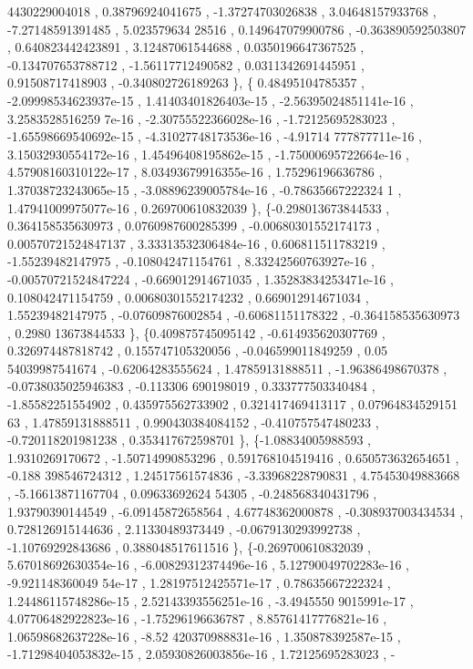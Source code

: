 \begin{DoxyCode}
      4430229004018 ,  0.38796924041675 , -1.37274703026838 ,  3.04648157933768 , -7.27148591391485 ,  5.023579634
      28516 , 0.149647079900786 , -0.363890592503807 , 0.640823442423891 ,  3.12487061544688 , 0.0350196647367525 
      , -0.134707653788712 , -1.56117712490582 , 0.0311342691445951 ,  0.91508717418903 , -0.340802726189263 \},
\{ 0.48495104785357 , -2.09998534623937e-15 , 1.41403401826403e-15 , -2.56395024851141e-16 , 3.2583528516259
      7e-16 , -2.30755522366028e-16 , -1.72125695283023 , -1.65598669540692e-15 , -4.31027748173536e-16 , -4.91714
      777877711e-16 , 3.15032930554172e-16 , 1.45496408195862e-15 , -1.75000695722664e-16 , 4.57908160310122e-17 ,
       8.03493679916355e-16 ,  1.75296196636786 , 1.37038723243065e-15 , -3.08896239005784e-16 , -0.78635667222324
      1 , 1.47941009975077e-16 , 0.269700610832039 \},
\{-0.298013673844533 , 0.364158535630973 , 0.0760987600285399 , -0.00680301552174173 , 0.00570721524847137 ,
       3.33313532306484e-16 , 0.606811511783219 , -1.55239482147975 , -0.108042471154761 , 8.33242560763927e-16 , 
      -0.00570721524847224 , -0.669012914671035 , 1.35283834253471e-16 , 0.108042471154759 , 0.00680301552174232 ,
       0.669012914671034 ,  1.55239482147975 , -0.07609876002854 , -0.60681151178322 , -0.364158535630973 , 0.2980
      13673844533 \},
\{0.409875745095142 , -0.614935620307769 , 0.326974487818742 , 0.155747105320056 , -0.046599011849259 , 0.05
      54039987541674 , -0.62064283555624 ,  1.47859131888511 , -1.96386498670378 , -0.0738035025946383 , -0.113306
      690198019 , 0.333777503340484 , -1.85582251554902 , 0.435975562733902 , 0.321417469413117 , 0.07964834529151
      63 ,  1.47859131888511 , 0.990430384084152 , -0.410757547480233 , -0.720118201981238 , 0.353417672598701 \},
\{-1.08834005988593 ,   1.9310269170672 , -1.50714990853296 , 0.591768104519416 , 0.650573632654651 , -0.188
      398546724312 ,  1.24517561574836 , -3.33968228790831 ,  4.75453049883668 , -5.16613871167704 , 0.09633692624
      54305 , -0.248568340431796 ,  1.93790390144549 , -6.09145872658564 ,  4.67748362000878 , -0.308937003434534 
      , 0.728126915144636 ,  2.11330489373449 , -0.0679130293992738 , -1.10769292843686 , 0.388048517611516 \},
\{-0.269700610832039 , 5.67018692630354e-16 , -6.00829312374496e-16 , 5.12790049702283e-16 , -9.921148360049
      54e-17 , 1.28197512425571e-17 ,  0.78635667222324 , 1.24486115748286e-15 , 2.52143393556251e-16 , -3.4945550
      9015991e-17 , 4.07706482922823e-16 , -1.75296196636787 , 8.85761417776821e-16 , 1.06598682637228e-16 , -8.52
      420370988831e-16 , 1.350878392587e-15 , -1.71298404053832e-15 , 2.05930826003856e-16 ,  1.72125695283023 , -

\end{DoxyCode}
